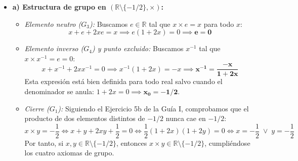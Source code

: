 \documentclass[11pt, a4paper]{article}
\begin{document}
\begin{itemize}
    \item \textbf{a) Estructura de grupo en $(\mathbb{R} \setminus \{-1/2\}, \times)$:}
    \begin{itemize}
        \item \textit{Elemento neutro ($G_3$):} Buscamos $e \in \mathbb{R}$ tal que $x \times e = x$ para todo $x$:
        \[
        x + e + 2xe = x \implies e(1 + 2x) = 0 \implies \mathbf{e = 0}
        \]
        \item \textit{Elemento inverso ($G_4$) y punto excluido:} Buscamos $x^{-1}$ tal que $x \times x^{-1} = e = 0$:
        \[
        x + x^{-1} + 2xx^{-1} = 0 \implies x^{-1}(1 + 2x) = -x \implies \mathbf{x^{-1} = \frac{-x}{1 + 2x}}
        \]
        Esta expresión está bien definida para todo real salvo cuando el denominador se anula: $1 + 2x = 0 \implies \mathbf{x_0 = -1/2}$.
        \item \textit{Cierre ($G_1$):} Siguiendo el Ejercicio 5b de la Guía I, comprobamos que el producto de dos elementos distintos de $-1/2$ nunca cae en $-1/2$:
        \[
        x \times y = -\frac{1}{2} \iff x + y + 2xy + \frac{1}{2} = 0 \iff \frac{1}{2}(1 + 2x)(1 + 2y) = 0 \iff x = -\frac{1}{2} \;\lor\; y = -\frac{1}{2}
        \]
        Por tanto, si $x, y \in \mathbb{R} \setminus \{-1/2\}$, entonces $x \times y \in \mathbb{R} \setminus \{-1/2\}$, cumpliéndose los cuatro axiomas de grupo.
    \end{itemize}


\end{itemize}
\end{document}
